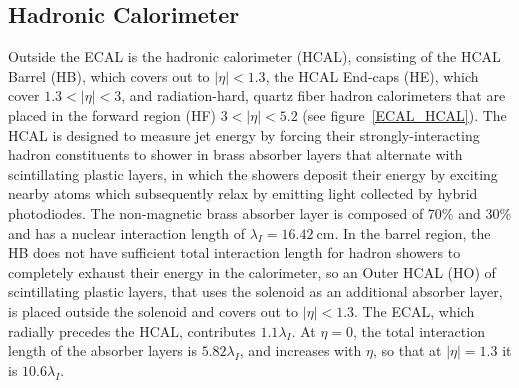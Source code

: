 \subsection{Hadronic Calorimeter}
Outside the ECAL is the hadronic calorimeter (HCAL), consisting of the HCAL Barrel (HB), which covers out to $\vert \eta \vert < 1.3$, the HCAL End-caps (HE), which cover $1.3 < \vert \eta \vert < 3$, and radiation-hard, quartz fiber hadron calorimeters that are placed in the forward region (HF) $3 < \vert \eta \vert < 5.2$ (see figure~\ref{ECAL_HCAL}).
The HCAL is designed to measure jet energy by forcing their strongly-interacting hadron constituents to shower in brass absorber layers that alternate with scintillating plastic layers, in which the showers deposit their energy by exciting nearby atoms which subsequently relax by emitting light collected by hybrid photodiodes.
The non-magnetic brass absorber layer is composed of 70\%  and 30\%  and has a nuclear interaction length of $\lambda_I = \SI{16.42}{\cm}$.
In the barrel region, the HB does not have sufficient total interaction length for hadron showers to completely exhaust their energy in the calorimeter, so an Outer HCAL (HO) of scintillating plastic layers, that uses the solenoid as an additional absorber layer, is placed outside the solenoid and covers out to $\vert \eta \vert < 1.3$.
The ECAL, which radially precedes the HCAL, contributes $1.1\lambda_I$.
At $\eta = 0$, the total interaction length of the absorber layers is $5.82\lambda_I$, and increases with $\eta$, so that at $\vert \eta \vert = 1.3$ it is $10.6\lambda_I$.

